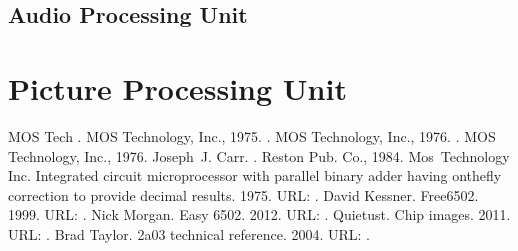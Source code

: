 \documentclass[letterpaper,10pt,english]{sphinxmanual}
\begin{document}
\newpage
\begin{landscape}

\end{landscape}
\newpage

\sphinxstepscope


\section{Audio Processing Unit}
\label{\detokenize{apu:audio-processing-unit}}\label{\detokenize{apu::doc}}
\sphinxstepscope


\chapter{Picture Processing Unit}
\label{\detokenize{ppu:picture-processing-unit}}\label{\detokenize{ppu::doc}}
\begin{sphinxthebibliography}{MOS Tech}
\sphinxAtStartPar
{}. MOS Technology, Inc., 1975.
\sphinxAtStartPar
{}. MOS Technology, Inc., 1976.
\sphinxAtStartPar
{}. MOS Technology, Inc., 1976.
\sphinxAtStartPar
Joseph J. Carr. . Reston Pub. Co., 1984.
\sphinxAtStartPar
Mos Technology Inc. Integrated circuit microprocessor with parallel binary adder having on\sphinxhyphen{}the\sphinxhyphen{}fly correction to provide decimal results. 1975. URL: .
\sphinxAtStartPar
David Kessner. Free\sphinxhyphen{}6502. 1999. URL: .
\sphinxAtStartPar
Nick Morgan. Easy 6502. 2012. URL: .
\sphinxAtStartPar
Quietust. Chip images. 2011. URL: .
\sphinxAtStartPar
Brad Taylor. 2a03 technical reference. 2004. URL: .
\end{sphinxthebibliography}



\renewcommand{\indexname}{Index}
\printindex
\end{document}
